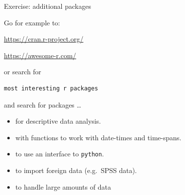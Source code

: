 \documentclass[
  10pt,
  ignorenonframetext,
]{beamer}
\providecommand{\tightlist}{%
  \setlength{\itemsep}{0pt}\setlength{\parskip}{0pt}}
\begin{document}
\begin{frame}[fragile]{Exercise: additional packages}
\protect\hypertarget{exercise-additional-packages}{}

\begin{block}{Go for example to:}

\url{https://cran.r-project.org/}

\url{https://awesome-r.com/}

\end{block}

\begin{block}{or search for}

\begin{verbatim}
most interesting r packages
\end{verbatim}

\end{block}

\begin{block}{and search for packages \ldots{}}

\begin{itemize}
\tightlist
\item
  for descriptive data analysis.
\item
  with functions to work with date-times and time-spans.
\item
  to use an interface to \texttt{python}.
\item
  to import foreign data (e.g.~SPSS data).
\item
  to handle large amounts of data
\end{itemize}

\end{block}

\end{frame}
\end{document}
